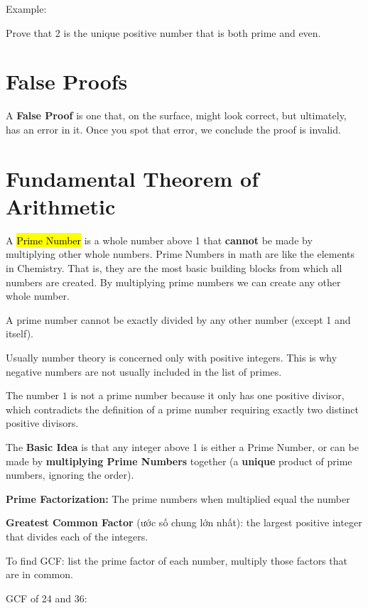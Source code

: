 Example:

Prove that 2 is the unique positive number that is both prime and even.

\section{False Proofs}

A \textbf{False Proof} is one that, on the surface, might look correct, but ultimately, has an error in it. Once you spot that error, we conclude the proof is invalid.

\section{Fundamental Theorem of Arithmetic}

A \hl{Prime Number} is a whole number above 1 that \textbf{cannot} be made by multiplying other whole numbers. Prime Numbers in math are like the elements in Chemistry. That is, they are the most basic building blocks from which all numbers are created. By multiplying prime numbers we can create any other whole number.

A prime number cannot be exactly divided by any other number (except 1 and itself).

Usually number theory is concerned only with positive integers. This is why negative numbers are not usually included in the list of primes.

The number \(\text{1}\) is not a prime number because it only has one positive divisor, which contradicts the definition of a prime number requiring exactly two distinct positive divisors. 

\vspace{5 mm}

The \textbf{Basic Idea} is that any integer above 1 is either a Prime Number, or can be made by \textbf{multiplying Prime Numbers} together (a \textbf{unique} product of prime numbers, ignoring the order).

\textbf{Prime Factorization:} The prime numbers when multiplied equal the number

\vspace{10 mm}

\textbf{Greatest Common Factor} (ước số chung lớn nhất): the largest positive integer that divides each of the integers.

To find GCF: list the prime factor of each number, multiply those factors that are in common.

GCF of 24 and 36:

